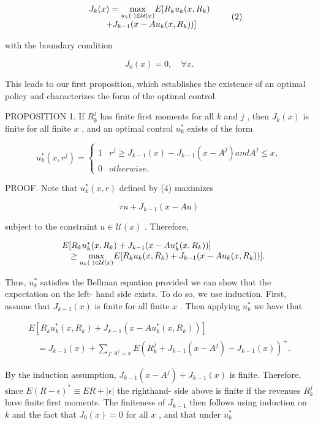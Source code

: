 \[
\begin{array}{r l} & {J_{k}(x) = \underset {u_{k}(\cdot)\in \mathcal{U}(x)}{\max}E[R_{k}u_{k}(x,R_{k})}\\ & {\qquad +J_{k - 1}(x - A u_{k}(x,R_{k}))]} \end{array} \tag{2}
\]

with the boundary condition

\[
J_{0}(x) = 0, \quad \forall x. \tag{3}
\]

This leads to our first proposition, which establishes the existence of
an optimal policy and characterizes the form of the optimal control.

PROPOSITION 1. If \(R_{k}^{j}\) has finite first moments for all \(k\)
and \(j\) , then \(J_{k}(x)\) is finite for all finite \(x\) , and an
optimal control \(u_{k}^{*}\) exists of the form

\[
u_{k}^{*}(x,r^{j}) = \left\{ \begin{array}{ll}1 & r^{j}\geq J_{k - 1}(x) - J_{k - 1}(x - A^{j})andA^{j}\leq x,\\ 0 & otherwise. \end{array} \right.
\]

PROOF. Note that \(u_{k}^{*}(x,r)\) defined by (4) maximizes

\[
r u + J_{k - 1}(x - A u)
\]

subject to the constraint \(u\in \mathcal{U}(x)\) . Therefore,

\[
\begin{array}{r l} & {E[R_{k}u_{k}^{*}(x,R_{k}) + J_{k - 1}(x - A u_{k}^{*}(x,R_{k}))]}\\ & {\quad \geq \underset {u_{k}(\cdot)\in \mathcal{U}(x)}{\max}E[R_{k}u_{k}(x,R_{k}) + J_{k - 1}(x - A u_{k}(x,R_{k}))].} \end{array}
\]

Thus, \(u_{k}^{*}\) satisfies the Bellman equation provided we can show
that the expectation on the left- hand side exists. To do so, we use
induction. First, assume that \(J_{k - 1}(x)\) is finite for all finite
\(x\) . Then applying \(u_{k}^{*}\) we have that

\[
\begin{array}{l}{{ E[R_{k}u_{k}^{*}(x,R_{k})+J_{k-1}(x-A u_{k}^{*}(x,R_{k}))]}}\\ {{\quad=J_{k-1}(x)+\sum_{j:A^{j}=x}E(R_{k}^{j}+J_{k-1}(x-A^{j})-J_{k-1}(x))^{+}.}}\end{array}
\]

By the induction assumption, \(J_{k - 1}(x - A^{j}) + J_{k - 1}(x)\) is
finite. Therefore, since
\(E(R - \epsilon)^{*}\equiv ER + \left\vert \epsilon \right\vert\) the
righthand- side above is finite if the revenues \(R_{k}^{j}\) have
finite first moments. The finiteness of \(J_{k - 1}\) then follows using
induction on \(k\) and the fact that \(J_{0}(x) = 0\) for all \(x\) ,
and that under \(u_{k}^{*}\)

